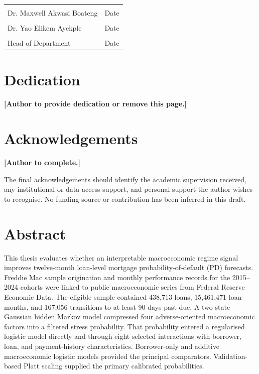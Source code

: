 \vspace{2.0cm}
\noindent\begin{tabular}{p{}p{}}
\hrulefill & \hrulefill\\
Dr. Maxwell Akwasi Boateng & Date\\[1.8cm]
\hrulefill & \hrulefill\\
Dr. Yao Elikem Ayekple & Date\\[1.8cm]
\hrulefill & \hrulefill\\
Head of Department & Date\\
\end{tabular}

\clearpage
\chapter*{Dedication}
\begin{center}
\textbf{[Author to provide dedication or remove this page.]}
\end{center}

\clearpage
\chapter*{Acknowledgements}
\textbf{[Author to complete.]}

The final acknowledgements should identify the academic supervision received, any institutional or data-access support, and personal support the author wishes to recognise. No funding source or contribution has been inferred in this draft.

\clearpage
\chapter*{Abstract}
\singlespacing
This thesis evaluates whether an interpretable macroeconomic regime signal improves twelve-month loan-level mortgage probability-of-default (PD) forecasts. Freddie Mac sample origination and monthly performance records for the 2015--2024 cohorts were linked to public macroeconomic series from Federal Reserve Economic Data. The eligible sample contained 438,713 loans, 15,461,471 loan-months, and 167,056 transitions to at least 90 days past due. A two-state Gaussian hidden Markov model compressed four adverse-oriented macroeconomic factors into a filtered stress probability. That probability entered a regularised logistic model directly and through eight selected interactions with borrower, loan, and payment-history characteristics. Borrower-only and additive macroeconomic logistic models provided the principal comparators. Validation-based Platt scaling supplied the primary calibrated probabilities.

